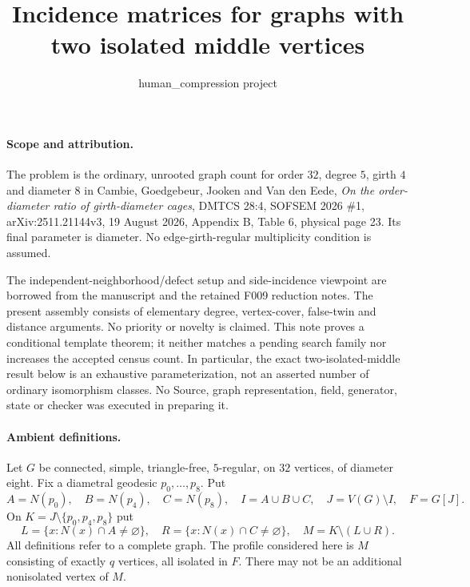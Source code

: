 \documentclass[11pt]{article}
\title{Incidence matrices for graphs with two isolated middle vertices}
\author{human\_compression project}
\date{}
\begin{document}
\maketitle

\paragraph{Scope and attribution.}
The problem is the ordinary, unrooted graph count for order $32$, degree
$5$, girth $4$ and diameter $8$ in Cambie, Goedgebeur, Jooken and
Van den Eede, \emph{On the order-diameter ratio of girth-diameter cages},
DMTCS 28:4, SOFSEM 2026 \#1, arXiv:2511.21144v3, 19 August 2026,
Appendix B, Table 6, physical page 23. Its final parameter is diameter.
No edge-girth-regular multiplicity condition is assumed.

The independent-neighborhood/defect setup and side-incidence viewpoint
are borrowed from the manuscript and the retained F009 reduction notes.
The present assembly consists of elementary degree, vertex-cover,
false-twin and distance arguments. No priority or novelty is claimed.
This note proves a conditional template theorem; it neither matches a
pending search family nor increases the accepted census count. In
particular, the exact two-isolated-middle result below is an exhaustive
parameterization, not an asserted number of ordinary isomorphism classes.
No Source, graph representation, field, generator, state or checker was
executed in preparing it.

\paragraph{Ambient definitions.}
Let $G$ be connected, simple, triangle-free, $5$-regular, on $32$
vertices, of diameter eight. Fix a diametral geodesic $p_0,\ldots,p_8$.
Put
\[
 A=N(p_0),\quad B=N(p_4),\quad C=N(p_8),\quad I=A\cup B\cup C,
 \quad J=V(G)\setminus I,\quad F=G[J].
\]
On $K=J\setminus\{p_0,p_4,p_8\}$ put
\[
 L=\{x:N(x)\cap A\ne\varnothing\},\quad
 R=\{x:N(x)\cap C\ne\varnothing\},\quad M=K\setminus(L\cup R).
\]
All definitions refer to a complete graph. The profile considered here
is $M$ consisting of exactly $q$ vertices, all isolated in $F$.
There may not be an additional nonisolated vertex of $M$.
\end{document}
